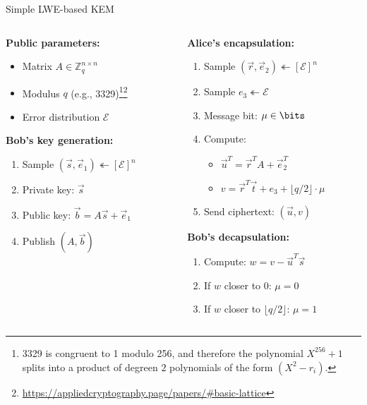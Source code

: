 \documentclass[aspectratio=169, lualatex, handout]{beamer}
\begin{document}
\begin{frame}{Simple LWE-based KEM}
	\begin{columns}[c]
		\begin{column}{0.5\textwidth}
			\textbf{Public parameters:}
			\begin{itemize}
				\item Matrix $A \in \mathbb{Z}_q^{n \times n}$
				\item Modulus $q$ (e.g., 3329)\footnote{3329 is congruent to 1 modulo 256, and therefore the polynomial $X^{256} + 1$ splits into a product of degreen $2$ polynomials of the form $(X^2 - r_{i}).$}\footnote{\url{https://appliedcryptography.page/papers/\#basic-lattice}}
				\item Error distribution $\mathcal{E}$
			\end{itemize}
			\textbf{Bob's key generation:}
			\begin{enumerate}
				\item Sample $(\vec{s}, \vec{e}_1) \twoheadleftarrow [\mathcal{E}]^n$
				\item Private key: $\vec{s}$
				\item Public key: $\vec{b} = A\vec{s} + \vec{e}_1$
				\item Publish $(A, \vec{b})$
			\end{enumerate}
		\end{column}
		\begin{column}{0.5\textwidth}
			\textbf{Alice's encapsulation:}
			\begin{enumerate}
				\item Sample $(\vec{r}, \vec{e}_2) \twoheadleftarrow [\mathcal{E}]^n$
				\item Sample $e_3 \twoheadleftarrow \mathcal{E}$
				\item Message bit: $\mu \in \bits$
				\item Compute:
				      \begin{itemize}
					      \item $\vec{u}^T = \vec{r}^{T}A + \vec{e}_{2}^{T}$
					      \item $v = \vec{r}^T\vec{t} + e_3 + \lfloor q/2 \rfloor \cdot \mu$
				      \end{itemize}
				\item Send ciphertext: $(\vec{u}, v)$
			\end{enumerate}
			\textbf{Bob's decapsulation:}
			\begin{enumerate}
				\item Compute: $w = v - \vec{u}^{T}\vec{s}$
				\item If $w$ closer to 0: $\mu = 0$
				\item If $w$ closer to $\lfloor q/2 \rfloor$: $\mu = 1$
			\end{enumerate}
		\end{column}
	\end{columns}
\end{frame}
\end{document}
